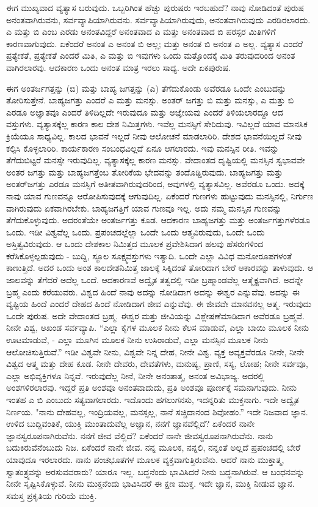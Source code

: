 ಈಗ ಮುಖ್ಯವಾದ ವ್ಯತ್ಯಾಸ ಬರುವುದು. ಒಬ್ಬರಿಗಿಂತ ಹೆಚ್ಚು ಪುರುಷರು ಇರಬಹುದೆ? ನಾವು ನೋಡಿದಂತೆ ಪುರುಷ ಅನಂತವಾಗಿರುವನು, ಸರ್ವವ್ಯಾಪಿಯಾಗಿರುವನು. ಸರ್ವವ್ಯಾಪಿಯಾಗಿರುವುದು, ಅನಂತವಾಗಿರುವುದು ಎರಡಿರಲಾರದು. ಎ ಮತ್ತು ಬಿ ಎಂಬ ಎರಡು ಅನಂತವಿದ್ದರೆ ಅನಂತವಾದ ಎ ಮತ್ತು ಅನಂತವಾದ ಬಿ ಪರಸ್ಪರ ಮಿತಿಗಳಿಗೆ ಕಾರಣವಾಗುವುದು. ಏಕೆಂದರೆ ಅನಂತ ಎ ಅನಂತ ಬಿ ಅಲ್ಲ; ಮತ್ತು ಅನಂತ ಬಿ ಅನಂತ ಎ ಅಲ್ಲ. ವ್ಯತ್ಯಾಸ ಎಂದರೆ ಪ್ರತ್ಯೇಕತೆ, ಪ್ರತ್ಯೇಕತೆ ಎಂದರೆ ಮಿತಿ, ಎ ಮತ್ತು ಬಿ ಇವುಗಳು ಒಂದು ಮತ್ತೊಂದಕ್ಕೆ ಮಿತಿ ತರುವುದರಿಂದ ಅನಂತ ವಾಗಿರಲಾರವು. ಆದಕಾರಣ ಒಂದು ಅನಂತ ಮಾತ್ರ ಇರಲು ಸಾಧ್ಯ. ಅದೇ ಏಕಪುರುಷ.

ಈಗ ಅಂತರ್ಜಗತ್ತನ್ನು (ಬಿ) ಮತ್ತು ಬಾಹ್ಯ ಜಗತ್ತನ್ನು (ಎ) ತೆಗೆದುಕೊಂಡು ಅವೆರಡೂ ಒಂದೇ ಎಂಬುದನ್ನು ತೋರಿಸುತ್ತೇನೆ. ಬಾಹ್ಯಜಗತ್ತು ಎಂದರೆ ಎ ಮತ್ತು ಮನಸ್ಸು. ಅಂತರ್‌ ಜಗತ್ತು ಬಿ ಮತ್ತು ಮನಸ್ಸು, ಎ ಮತ್ತು ಬಿ ಎರಡೂ ಅಜ್ಞಾತವೂ ಎಂದರೆ ತಿಳಿದಿಲ್ಲದೇ ಇರುವುದೂ ಮತ್ತು ಅಜ್ಞೇಯವು ಎಂದರೆ ತಿಳಿಯಲಾರದ್ದೂ ಆದ ವಸ್ತುಗಳು. ವ್ಯತ್ಯಾಸಕ್ಕೆಲ್ಲ ಕಾರಣ ಕಾಲ ದೇಶ ನಿಮಿತ್ತಗಳು. ಇವೆಲ್ಲ ಮನಸ್ಸಿಗೆ ಸೇರಿದುವು. ಇವಿಲ್ಲದೆ ಯಾವ ಮಾನಸಿಕ ಕ್ರಿಯೆಯೂ ಸಾಧ್ಯವಿಲ್ಲ. ಕಾಲದ ಭಾವನೆ ಇಲ್ಲದೆ ನೀವು ಆಲೋಚನೆ ಮಾಡಲಾರಿರಿ. ದೇಶದ ಭಾವನೆಯಿಲ್ಲದೆ ನೀವು ಕಲ್ಪಿಸಿ ಕೊಳ್ಳಲಾರಿರಿ. ಕಾರ್ಯಕಾರಣ ಸಂಬಂಧವಿಲ್ಲದೆ ಏನೂ ಆಗಲಾರದು. ಇವು ಮನಸ್ಸಿನ ರೀತಿ. ಇವನ್ನು ತೆಗೆದುಬಿಟ್ಟರೆ ಮನಸ್ಸೇ ಇರುವುದಿಲ್ಲ. ವ್ಯತ್ಯಾಸಕ್ಕೆಲ್ಲ ಕಾರಣ ಮನಸ್ಸು. ವೇದಾಂತದ ದೃಷ್ಟಿಯಲ್ಲಿ ಮನಸ್ಸಿನ ಸ್ವಭಾವವೇ ಅಂತರ ಜಗತ್ತು ಮತ್ತು ಬಾಹ್ಯಜಗತ್ತೆಂಬ ತೋರಿಕೆಯ ಭೇದವನ್ನು ತಂದೊಡ್ಡಿರುವುದು. ಬಾಹ್ಯಜಗತ್ತು ಮತ್ತು ಅಂತರ್‌ಜಗತ್ತು ಎರಡೂ ಮನಸ್ಸಿಗೆ ಅತೀತವಾಗಿರುವುದರಿಂದ, ಅವುಗಳಲ್ಲಿ ವ್ಯತ್ಯಾಸವಿಲ್ಲ. ಅವೆರಡೂ ಒಂದು. ಅದಕ್ಕೆ ನಾವು ಯಾವ ಗುಣವನ್ನೂ ಆರೋಪಿಸುವುದಕ್ಕೆ ಆಗುವುದಿಲ್ಲ. ಏಕೆಂದರೆ ಗುಣಗಳು ಹುಟ್ಟುವುದು ಮನಸ್ಸಿನಲ್ಲಿ, ನಿರ್ಗುಣ ವಾಗಿರುವುದು ಏಕವಾಗಿರಬೇಕು. ಬಾಹ್ಯಜಗತ್ತಿಗೆ ಯಾವ ಗುಣವೂ ಇಲ್ಲ. ಅದು ನಮ್ಮ ಮನಸ್ಸಿನ ಗುಣವನ್ನು ತೆಗೆದುಕೊಳ್ಳುವುದು. ಅದರಂತೆಯೇ ಅಂತರ್ಜಗತ್ತು ಕೂಡ. ಆದಕಾರಣ ಬಾಹ್ಯಜಗತ್ತು ಮತ್ತು ಅಂತರ್ಜಗತ್ತುಗಳೆರಡೂ ಒಂದು. ಇಡೀ ವಿಶ್ವವೆಲ್ಲ ಒಂದು. ಪ್ರಪಂಚದಲ್ಲೆಲ್ಲಾ ಒಂದೇ ಒಂದು ಆತ್ಮವಿರುವುದು, ಒಂದೇ ಒಂದು ಅಸ್ತಿತ್ವವಿರುವುದು. ಆ ಒಂದು ದೇಶಕಾಲ ನಿಮಿತ್ತದ ಮೂಲಕ ಪ್ರವೇಶಿಸಿದಾಗ ಹಲವು ಹೆಸರುಗಳಿಂದ ಕರೆಸಿಕೊಳ್ಳಲ್ಪಡುವುದು - ಬುದ್ದಿ, ಸ್ಥೂಲ ಸೂಕ್ಷ್ಮವಸ್ತುಗಳು ಇತ್ಯಾದಿ. ಒಂದೇ ಎಲ್ಲಾ ವಿವಿಧ ಮನೋರೂಪಗಳಂತೆ ಕಾಣುತ್ತಿದೆ. ಅದರ ಒಂದು ಅಂಶ ಕಾಲದೇಶನಿಮಿತ್ತ ಜಾಲಕ್ಕೆ ಸಿಕ್ಕಿದಂತೆ ತೋರಿದಾಗ ಬೇರೆ ಆಕಾರವನ್ನು ತಾಳುವುದು. ಆ ಜಾಲವನ್ನು ತೆಗೆದರೆ ಅದೆಲ್ಲ ಒಂದೆ. ಆದಕಾರಣವೆ ಅದ್ವೈತ ತತ್ವದಲ್ಲಿ ಇಡೀ ಬ್ರಹ್ಮಾಂಡವೆಲ್ಲ ಆತ್ಮೈಕ್ಯವಾಗಿದೆ. ಅದನ್ನೇ ಬ್ರಹ್ಮ ಎಂದು ಕರೆಯುವರು. ವಿಶ್ವದ ಹಿಂದೆ ನಾವು ಅದನ್ನು ನೋಡಿದಾಗ ಅದನ್ನು ಈಶ್ವರ ಎನ್ನುವೆವು. ಅದನ್ನು ಈ ವ್ಯಷ್ಟಿಯ ಹಿಂದೆ ಎಂದರೆ ದೇಹದ ಹಿಂದೆ ನೋಡಿದಾಗ ಜೀವ ಎನ್ನುವೆವು. ಈ ಜೀವವೇ ಮಾನವನಲ್ಲ ಆತ್ಮ. ಇರುವುದು ಒಂದೇ ಪುರುಷ. ಅದೇ ವೇದಾಂತದ ಬ್ರಹ್ಮ. ಈಶ್ವರ ಮತ್ತು ಜೀವಿಯನ್ನು ವಿಶ್ಲೇಷಣೆಮಾಡಿದಾಗ ಅವೆರಡೂ ಬ್ರಹ್ಮವೆ. ನೀನೇ ವಿಶ್ವ, ಅಖಂಡ ಸರ್ವವ್ಯಾಪಿ. “ಎಲ್ಲಾ ಕೈಗಳ ಮೂಲಕ ನೀನು ಕೆಲಸ ಮಾಡುವೆ, ಎಲ್ಲಾ ಬಾಯಿ ಮೂಲಕ ನೀನು ಊಟಮಾಡುವೆ, - ಎಲ್ಲಾ ಮೂಗಿನ ಮೂಲಕ ನೀನು ಉಸಿರಾಡುವೆ, ಎಲ್ಲಾ ಮನಸ್ಸಿನ ಮೂಲಕ ನೀನು ಆಲೋಚಿಸುತ್ತಿರುವೆ.'' ಇಡೀ ವಿಶ್ವವೇ ನೀನು, ವಿಶ್ವವೇ ನಿನ್ನ ದೇಹ, ನೀನೇ ವಿಶ್ವ. ವ್ಯಕ್ತ ಅವ್ಯಕ್ತವೆರಡೂ ನೀನೇ, ನೀನೇ ವಿಶ್ವದ ಆತ್ಮ ಮತ್ತು ದೇಹ ಕೂಡ. ನೀನೇ ದೇವರು, ದೇವತೆಗಳು, ಮನುಷ್ಯ, ಪ್ರಾಣಿ, ಸಸ್ಯ, ಲೋಹ; ನೀನೇ ಸರ್ವವೂ, ಎಲ್ಲಾ ಅಭಿವ್ಯಕ್ತಿಗಳೂ ನಿನ್ನವೆ. ಇರುವುದೆಲ್ಲ ನೀನೆ, ನೀನೇ ಅನಂತಾತ್ಮ, ಅನಂತ ಅವಿಭಾಜ್ಯ. ಅದರಲ್ಲಿ ಅಂಶಗಳಿರಲಾರವು. ಇದ್ದರೆ ಪ್ರತಿ ಅಂಶವೂ ಅನಂತವಾದುದು, ಪ್ರತಿ ಅಂಶವೂ ಪೂರ್ಣಕ್ಕೆ ಸಮನಾಗುವುದು. ನೀನು ಇಂತಹ ಎ ಬಿ ಎಂಬುದು ಸತ್ಯವಾಗಲಾರದು. ಇದೊಂದು ಹಗಲುಗನಸು, ಇದನ್ನರಿತು ಮುಕ್ತನಾಗು. ಇದೇ ಅದ್ವೈತ ನಿರ್ಣಯ. "ನಾನು ದೇಹವಲ್ಲ, ಇಂದ್ರಿಯವಲ್ಲ, ಮನಸ್ಸಲ್ಲ, ನಾನೆ ಸಚ್ಚಿದಾನಂದ ಶಿವೋಹಂ.'' ಇದೇ ನಿಜವಾದ ಜ್ಞಾನ. ಉಳಿದ ಬುದ್ದಿವಂತಿಕೆ, ಯುಕ್ತಿ ಮುಂತಾದುವೆಲ್ಲ ಅಜ್ಞಾನ, ನನಗೆ ಜ್ಞಾನವೆಲ್ಲಿದೆ? ಏಕೆಂದರೆ ನಾನೇ ಜ್ಞಾನಸ್ವರೂಪನಾಗಿರುವೆನು. ನನಗೆ ಜೀವ ವೆಲ್ಲಿದೆ? ಏಕೆಂದರೆ ನಾನೇ ಜೀವಸ್ವರೂಪನಾಗಿರುವೆನು. ನಾನು ಬದುಕಿರುವೆನೆಂಬುದು ನಿಜ. ಏಕೆಂದರೆ ನಾನೇ ಜೀವ. ನನ್ನ ಮೂಲಕ, ನನ್ನಲಿ, ನನ್ನಂತೆ ಅಲ್ಲದೆ ಪ್ರಪಂಚದಲ್ಲಿ ಬೇರೆ ಯಾವುದೂ ಇರಲಾರದು. ನಾನು ಪಂಚಭೂತಗಳ ಮೂಲಕ ವ್ಯಕ್ತವಾಗುತ್ತಿರುವೆನು. ಆದರೆ ನಾನು ಮುಕ್ತಾತ್ಮ, ಸ್ವಾತಂತ್ರ್ಯವನ್ನು ಅರಸುವವರಾರು? ಯಾರೂ ಇಲ್ಲ. ಬದ್ಧನೆಂದು ಭಾವಿಸಿದರೆ ನೀನು ಬದ್ಧನಾಗಿರುವೆ. ಆ ಬಂಧನವನ್ನು ನೀನೇ ಸೃಷ್ಟಿಸಿಕೊಳ್ಳುವೆ. ನೀನು ಮುಕ್ತನೆಂದು ಭಾವಿಸಿದರೆ ಈ ಕ್ಷಣ ಮುಕ್ತ. ಇದೇ ಜ್ಞಾನ, ಮುಕ್ತಿ ನೀಡುವ ಜ್ಞಾನ. ಸಮಸ್ತ ಪ್ರಕೃತಿಯ ಗುರಿಯೆ ಮುಕ್ತಿ.

